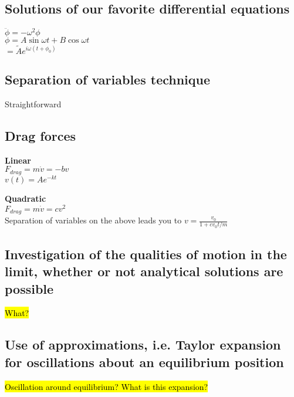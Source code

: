 \documentclass[a4paper, 11pt]{article}
\begin{document}
  \subsection{Solutions of our favorite differential equations}

  $\ddot{\phi} = -\omega^2 \phi$\\
  $\phi = A \sin{\omega t} + B \cos{\omega t}$ \\
  $ = \tilde{A}e^{i \omega \left(t + \phi_0 \right)}$



  \subsection{Separation of variables technique}
  Straightforward


  \subsection{Drag forces}

  \textbf{Linear}\\
  $F_{drag} = m \dot{v} = - b v$\\
  $v(t) = A e^{-kt}$

\quad

  \textbf{Quadratic}\\
  $F_{drag} = m \dot{v} = c v^2$\\
  Separation of variables on the above leads you to $v = \frac{v_0}{1 + c v_0 t / m}$

\quad



  \subsection{Investigation of the qualities of motion in the limit, whether or not
  analytical solutions are possible}

  \hl{What?}


  \subsection{Use of approximations, i.e. Taylor expansion for oscillations about an
  equilibrium position}

  \hl{Oscillation around equilibrium? What is this expansion?}
\end{document}
